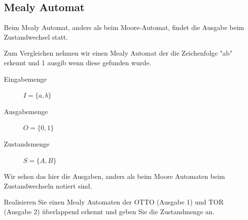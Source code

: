 \documentclass{article}
\begin{document}
\subsection{Mealy Automat}


Beim Mealy Automat, anders als beim Moore-Automat, findet die Ausgabe beim Zustandwechsel statt. 

Zum Vergleichen nehmen wir einen Mealy Automat der die Zeichenfolge "ab" erkennt und 1 ausgib wenn diese gefunden wurde.

\begin{description}
    \item[Eingabemenge]  $I=\{a,b\}$
    \item[Ausgabemenge]  $O=\{0,1\}$
    \item[Zustandsmenge] $S=\{A,B\}$
\end{description}

\begin{center}
\end{center}

Wir sehen das hier die Ausgaben, anders als beim Moore Automaten beim Zustandwechseln notiert sind. 


\begin{question}[]
    Realisieren Sie einen Mealy Automaten der OTTO (Ausgabe 1) und TOR (Ausgabe 2)  überlappend erkennt und geben Sie die Zustandmenge an.
\end{question}
\end{document}
